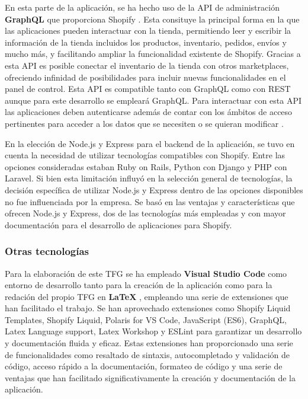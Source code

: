 \documentclass[11pt]{article}
\begin{document}
En esta parte de la aplicación, se ha hecho uso de la API de administración \textbf{GraphQL} que proporciona Shopify \cite{api-administracion-graphql}. Esta consituye la principal forma en la que 
las aplicaciones pueden interactuar con la tienda, permitiendo leer y escribir la información de la tienda incluidos los productos, inventario, pedidos,
envíos y mucho más, y facilitando ampliar la funcionalidad existente de Shopify. Gracias a esta API es posible conectar el inventario
de la tienda con otros marketplaces, ofreciendo infinidad de posibilidades para incluir nuevas funcionalidades en el panel de control.
Esta API es compatible tanto con GraphQL como con REST aunque para este desarrollo se empleará GraphQL. Para interactuar con esta API las aplicaciones
deben autenticarse además de contar con los ámbitos de acceso pertinentes para acceder a los datos que se necesiten o se quieran modificar \cite{shopify-dev}.

En la elección de Node.js y Express para el backend de la aplicación, se tuvo en cuenta la necesidad de utilizar tecnologías compatibles con Shopify. Entre 
las opciones consideradas estaban Ruby on Rails, Python con Django y PHP con Laravel. Si bien esta limitación influyó en la selección general de tecnologías, 
la decisión específica de utilizar Node.js y Express dentro de las opciones disponibles no fue influenciada por la empresa. Se basó en las ventajas 
y características que ofrecen Node.js y Express, dos de las tecnologías más empleadas y con mayor documentación para el desarrollo de aplicaciones para Shopify.

\subsubsection{Otras tecnologías}
Para la elaboración de este TFG se ha empleado \textbf{Visual Studio Code} \cite{vsc} como entorno de desarrollo tanto para la creación de la aplicación como para
la redación del propio TFG en \textbf{LaTeX} \cite{latex}, empleando una serie de extensiones que han facilitado el trabajo. 
Se han aprovechado extensiones como Shopify Liquid Templates, Shopify Liquid, 
Polaris for VS Code, JavaScript (ES6), GraphQL, Latex Language support, Latex Workshop y ESLint para garantizar un desarrollo y documentación
fluida y eficaz. Estas extensiones han proporcionado una serie de funcionalidades como resaltado de sintaxis, autocompletado y validación de código, 
acceso rápido a la documentación, formateo de código y una serie de ventajas que han facilitado significativamente la creación y documentación de la aplicación.
\end{document}

